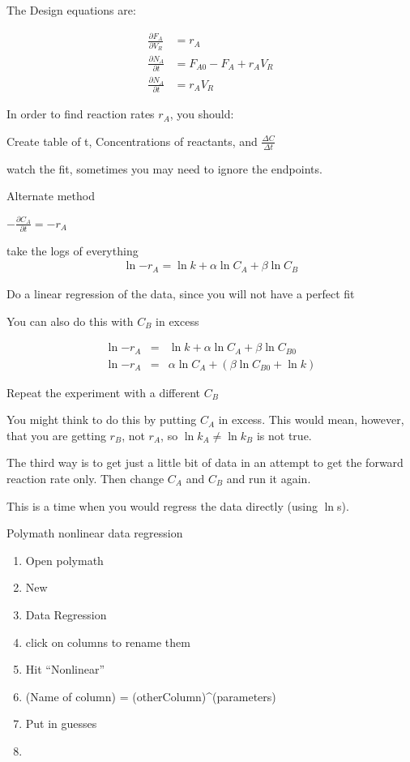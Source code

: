 \documentclass[a4paper]{article}
\begin{document}
The Design equations are:

\begin{eqnarray}
	\frac{ \partial F_A}{ \partial V_R}&= r_A \label{PFR}\\
	\frac{ \partial N_A}{ \partial t}&= F_{A0}-F_A+r_A V_R \label{CSTR}\\
	\frac{ \partial N_A}{ \partial t}&= r_A V_R \label{Batch}
\end{eqnarray}

In order to find reaction rates $r_A$, you should:
\begin{list}{ }{ }
	\item Create table of t, Concentrations of reactants, and $\frac{ \Delta C}{ \Delta t}$
	\item watch the fit, sometimes you may need to ignore the endpoints.
\end{list}

Alternate method

\begin{list}{}{}
	\item $-\frac{ \partial C_A}{ \partial t}= -r_A$
	\item take the logs of everything
		\begin{eqnarray}
			\ln{-r_A}=\ln{k}+\alpha \ln{C_A}+\beta \ln{C_B}
			\label{log scale of design equation}
		\end{eqnarray}
	\item Do a linear regression of the data, since you will not have a perfect fit
	\item You can also do this with $C_B$ in excess
	\item \begin{eqnarray}
			\ln{-r_A}&=&\ln{k}+\alpha \ln{C_A}+\beta \ln{C_{B0}}\\
			\ln{-r_A}&=&\alpha \ln{C_A}+(\beta \ln{C_{B0}}+ \ln{k})
		\end{eqnarray}
	\item Repeat the experiment with a different $C_B$
	\item You might think to do this by putting $C_A$ in excess. This would mean, however, that you are getting $r_B$, not $r_A$, so $\ln{k_A} \not= \ln{k_B}$ is not true.
\end{list}

\begin{list}{}{}
\item The third way is to get just a little bit of data in an attempt to get the forward reaction rate only. Then change $C_A$ and $C_B$ and run it again.
\item This is a time when you would regress the data directly (using $\ln{}$s).
\end{list}

Polymath nonlinear data regression
\begin{enumerate}
	\item Open polymath
	\item New
	\item Data Regression
	\item click on columns to rename them
	\item Hit ``Nonlinear''
	\item (Name of column) = (otherColumn)^(parameters)
	\item Put in guesses
	\item 
\end{enumerate}
\end{document}

